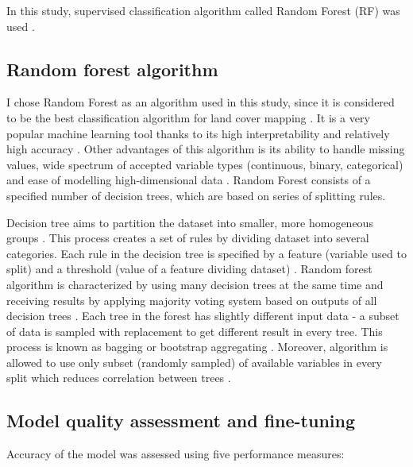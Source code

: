 \documentclass{amuthesis}
\begin{document}
In this study, supervised classification algorithm called Random Forest
(RF) was used \autocite{breiman_random_2001}.

\hypertarget{sec-rf}{%
\subsection{Random forest algorithm}\label{sec-rf}}

I chose Random Forest as an algorithm used in this study, since it is
considered to be the best classification algorithm for land cover
mapping \autocite{talukdar_land-use_2020}. It is a very popular machine
learning tool thanks to its high interpretability and relatively high
accuracy \autocite{qi_random_2012}. Other advantages of this algorithm
is its ability to handle missing values, wide spectrum of accepted
variable types (continuous, binary, categorical) and ease of modelling
high-dimensional data \autocite{qi_random_2012}. Random Forest consists
of a specified number of decision trees, which are based on series of
splitting rules.

Decision tree aims to partition the dataset into smaller, more
homogeneous groups \autocite{kuhn_applied_2013}. This process creates a
set of rules by dividing dataset into several categories. Each rule in
the decision tree is specified by a feature (variable used to split) and
a threshold (value of a feature dividing dataset)
\autocite{sekulic_random_2020}. Random forest algorithm is characterized
by using many decision trees at the same time and receiving results by
applying majority voting system based on outputs of all decision trees
\autocite{kuhn_applied_2013}. Each tree in the forest has slightly
different input data - a subset of data is sampled with replacement to
get different result in every tree. This process is known as bagging or
bootstrap aggregating \autocite{schonlau_random_2020}. Moreover,
algorithm is allowed to use only subset (randomly sampled) of available
variables in every split which reduces correlation between trees
\autocite{sohil_introduction_2022}.

\hypertarget{sec-resampling}{%
\subsection{Model quality assessment and
fine-tuning}\label{sec-resampling}}

Accuracy of the model was assessed using five performance measures:
\end{document}
